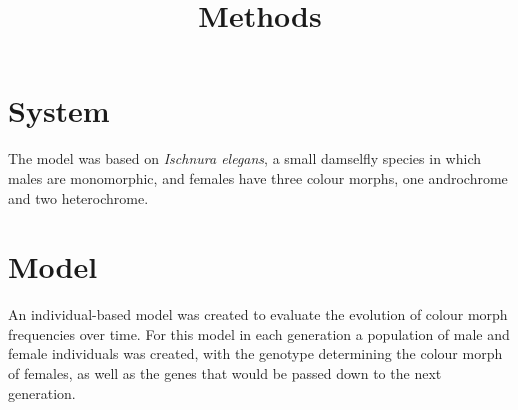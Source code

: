 \documentclass[10pt,letterpaper]{article}
\title{Methods}
\date{\vspace{-5ex}}
\begin{document}
\maketitle

\section{System}
The model was based on \textit{Ischnura elegans}, a small damselfly species in which males are monomorphic, and females have three colour morphs, one androchrome and two heterochrome.

\section{Model}
An individual-based model was created to evaluate the evolution of colour morph frequencies over time. For this model in each generation a population of male and female individuals was created, with the genotype determining the colour morph of females, as well as the genes that would be passed down to the next generation.


\end{document}
